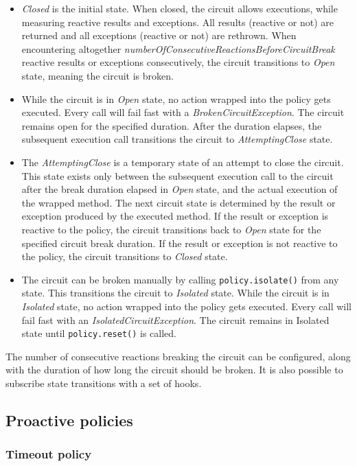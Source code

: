 \begin{itemize}
\item \emph{Closed} is the initial state. When closed, the circuit allows executions, while measuring reactive results and exceptions. All results (reactive or not) are returned and all exceptions (reactive or not) are rethrown. When encountering altogether \emph{numberOfConsecutiveReactionsBeforeCircuitBreak} reactive results or exceptions consecutively, the circuit transitions to \emph{Open} state, meaning the circuit is broken.
\item While the circuit is in \emph{Open} state, no action wrapped into the policy gets executed. Every call will fail fast with a \emph{BrokenCircuitException}. The circuit remains open for the specified duration. After the duration elapses, the subsequent execution call transitions the circuit to \emph{AttemptingClose} state.
\item The \emph{AttemptingClose} is a temporary state of an attempt to close the circuit. This state exists only between the subsequent execution call to the circuit after the break duration elapsed in \emph{Open} state, and the actual execution of the wrapped method. The next circuit state is determined by the result or exception produced by the executed method. If the result or exception is reactive to the policy, the circuit transitions back to \emph{Open} state for the specified circuit break duration. If the result or exception is not reactive to the policy, the circuit transitions to \emph{Closed} state.
\item The circuit can be broken manually by calling \lstinline{policy.isolate()} from any state. This transitions the circuit to \emph{Isolated} state. While the circuit is in \emph{Isolated} state, no action wrapped into the policy gets executed. Every call will fail fast with an \emph{IsolatedCircuitException}. The circuit remains in Isolated state until \lstinline{policy.reset()} is called.
\end{itemize}

The number of consecutive reactions breaking the circuit can be configured, along with the duration of how long the circuit should be broken. It is also possible to subscribe state transitions with a set of hooks.

\subsection{Proactive policies}

\subsubsection{Timeout policy}

